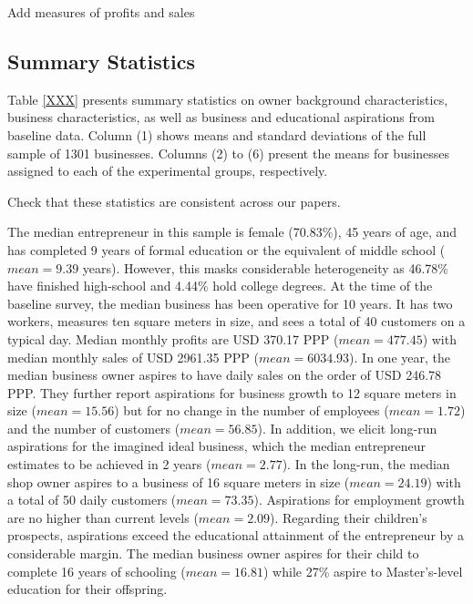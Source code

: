 \documentclass[11.5pt]{article}
\begin{document}
\textcolor[rgb]{1.00,0.00,0.00}{Add measures of profits and sales}

\subsection{Summary Statistics}

Table \ref{XXX} presents summary statistics on owner background characteristics, business characteristics, as well as business and educational aspirations from baseline data. Column (1) shows means and standard deviations of the full sample of 1301 businesses. Columns (2) to (6) present the means for businesses assigned to each of the experimental groups, respectively.

\textcolor[rgb]{1.00,0.00,0.00}{Check that these statistics are consistent across our papers. }

The median entrepreneur in this sample is female (70.83\%), 45 years of age, and has completed 9 years of formal education or the equivalent of middle school ($mean = 9.39$ years). However, this masks considerable heterogeneity as 46.78\% have finished high-school and 4.44\% hold college degrees. At the time of the baseline survey, the median business has been operative for 10 years. It has two workers, measures ten square meters in size, and sees a total of 40 customers on a typical day. Median monthly profits are USD 370.17 PPP ($mean = 477.45$) with median monthly sales of USD 2961.35 PPP ($mean = 6034.93$). In one year, the median business owner aspires to have daily sales on the order of USD 246.78 PPP. They further report aspirations for business growth to 12 square meters in size ($mean = 15.56$) but for no change in the number of employees ($mean = 1.72$) and the number of customers ($mean = 56.85$). In addition, we elicit long-run aspirations for the imagined ideal business, which the median entrepreneur estimates to be achieved in 2 years ($mean = 2.77$). In the long-run, the median shop owner aspires to a business of 16 square meters in size ($mean = 24.19$) with a total of 50 daily customers ($mean = 73.35$). Aspirations for employment growth are no higher than current levels ($mean = 2.09$). Regarding their children's prospects, aspirations exceed the educational attainment of the entrepreneur by a considerable margin. The median business owner aspires for their child to complete 16 years of schooling ($mean = 16.81$) while 27\% aspire to Master's-level education for their offspring. %
\end{document}
